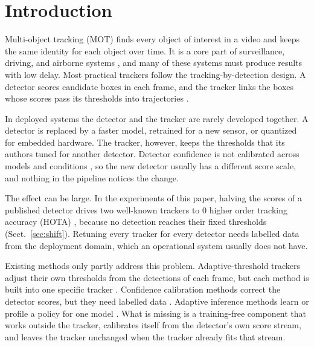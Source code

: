 \documentclass[pdflatex,sn-mathphys-num,iicol]{sn-jnl}
\begin{document}
\maketitle

\section{Introduction}\label{sec:intro}

Multi-object tracking (MOT) finds every object of interest in a video and
keeps the same identity for each object over time. It is a core part of
surveillance, driving, and airborne systems
\cite{zhu2022visdrone,wu2022uavsurvey,lu2024uavdetection}, and many of these systems
must produce results with low delay. Most practical trackers follow the
tracking-by-detection design. A detector scores candidate boxes in each frame,
and the tracker links the boxes whose scores pass its thresholds into
trajectories \cite{bewley2016sort,zhang2022bytetrack,cao2023ocsort}.

In deployed systems the detector and the tracker are rarely developed
together. A detector is replaced by a faster model, retrained for a new
sensor, or quantized for embedded hardware. The tracker, however, keeps the
thresholds that its authors tuned for another detector. Detector confidence is
not calibrated across models and conditions \cite{kuppers2020detcalib}, so the
new detector usually has a different score scale, and nothing in the pipeline
notices the change.

The effect can be large. In the experiments of this paper, halving the scores
of a published detector drives two well-known trackers to 0 higher order
tracking accuracy (HOTA) \cite{luiten2021hota}, because no detection reaches
their fixed thresholds (Sect.~\ref{sec:shift}). Retuning
every tracker for every detector needs labelled data from the deployment
domain, which an operational system usually does not have.

Existing methods only partly address this problem. Adaptive-threshold
trackers adjust their own thresholds from the detections of each frame, but
each method is built into one specific tracker
\cite{ma2023adaptivebytetrack,shim2024adaptrack,act2026adaptive}. Confidence
calibration methods correct the detector scores, but they need labelled data
\cite{kuppers2020detcalib}. Adaptive inference methods learn or profile a
policy for one model \cite{han2022dynamic,jiang2018chameleon}. What is missing
is a training-free component that works outside the tracker, calibrates itself
from the detector's own score stream, and leaves the tracker unchanged when
the tracker already fits that stream.
\end{document}
